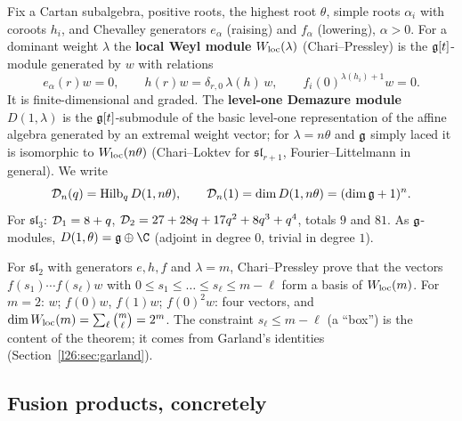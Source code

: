 Fix a Cartan subalgebra, positive roots, the highest root $\theta$, simple roots $\alpha_i$ with coroots $h_i$, and
Chevalley generators $e_\alpha$ (raising) and $f_\alpha$ (lowering), $\alpha>0$. For a dominant weight $\lambda$ the
\textbf{local Weyl module} $W_{\mathrm{loc}}(\lambda)$ (Chari--Pressley) is the $\mathfrak g[t]$-module generated by $w$ with
relations
\begin{equation}\label{l26:eq:weyl}
e_\alpha(r)w=0,\qquad h(r)w=\delta_{r,0}\,\lambda(h)\,w,\qquad f_i(0)^{\lambda(h_i)+1}w=0 .
\end{equation}
It is finite-dimensional and graded. The \textbf{level-one Demazure module} $D(1,\lambda)$ is the $\mathfrak g[t]$-submodule
of the basic level-one representation of the affine algebra generated by an extremal weight vector; for $\lambda=n\theta$ and
$\mathfrak g$ simply laced it is isomorphic to $W_{\mathrm{loc}}(n\theta)$ (Chari--Loktev for $\mathfrak{sl}_{r+1}$,
Fourier--Littelmann in general). We write
\begin{equation*}
\mathcal D_n(q)=\operatorname{Hilb}_q D(1,n\theta),\qquad \mathcal D_n(1)=\dim D(1,n\theta)=(\dim\mathfrak g+1)^n .
\end{equation*}
For $\mathfrak{sl}_3$: $\mathcal D_1=8+q$, $\mathcal D_2=27+28q+17q^2+8q^3+q^4$, totals $9$ and $81$. As
$\mathfrak g$-modules, $D(1,\theta)=\ltwentysixg\oplus\C$ (adjoint in degree $0$, trivial in degree $1$).

\begin{example}\label{l26:ex:sl2}
For $\mathfrak{sl}_2$ with generators $e,h,f$ and $\lambda=m$, Chari--Pressley prove that the vectors
$f(s_1)\cdots f(s_\ell)w$ with $0\le s_1\le\dots\le s_\ell\le m-\ell$ form a basis of $W_{\mathrm{loc}}(m)$. For $m=2$:
$w$; $f(0)w$, $f(1)w$; $f(0)^2w$: four vectors, and $\dim W_{\mathrm{loc}}(m)=\sum_\ell\binom m\ell=2^m$. The constraint
$s_\ell\le m-\ell$ (a ``box'') is the content of the theorem; it comes from Garland's identities
(Section~\ref{l26:sec:garland}).
\end{example}

\subsection{Fusion products, concretely}\label{l26:sec:fusion}

